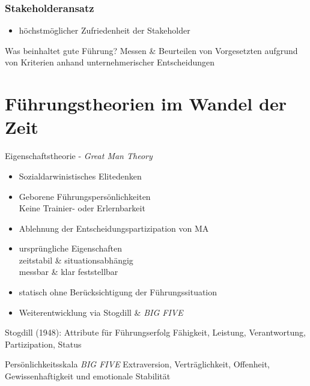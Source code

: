 \documentclass{cheatsheet}
\begin{document}
    \begin{normbox}{\subsubsection{Stakeholderansatz}}
        \begin{itemize}
            \item höchstmöglicher Zufriedenheit der Stakeholder
        \end{itemize}
    \end{normbox}
    \begin{warningbox}{Was beinhaltet gute Führung?}
        Messen \& Beurteilen von Vorgesetzten aufgrund von Kriterien anhand unternehmerischer Entscheidungen 
    \end{warningbox}
    \section{Führungstheorien im Wandel der Zeit}   
        \begin{sectionbox}{Eigenschaftstheorie - \emph{Great Man Theory}}
        \begin{itemize}
            \item Sozialdarwinistisches Elitedenken
            \item Geborene Führungspersönlichkeiten\\
            \ra Keine Trainier- oder Erlernbarkeit
            \item Ablehnung der Entscheidungspartizipation von MA
            \item ursprüngliche Eigenschaften\\
            \ra zeitstabil \& situationsabhängig\\
            \ra messbar \& klar feststellbar
            \item statisch ohne Berücksichtigung der Führungssituation
            \item Weiterentwicklung via Stogdill \& \emph{BIG FIVE}
        \end{itemize}
    \end{sectionbox}
        \begin{hintbox}{Stogdill (1948): Attribute für Führungserfolg}
            Fähigkeit, Leistung, Verantwortung, Partizipation, Status
        \end{hintbox}
        \begin{hintbox}{Persönlichkeitsskala \emph{BIG FIVE}}
            Extraversion, Verträglichkeit, Offenheit, Gewissenhaftigkeit und emotionale Stabilität
        \end{hintbox}
\end{document}
